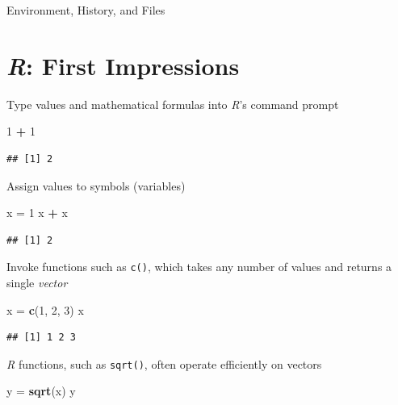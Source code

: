 \documentclass[]{article}
\newenvironment{Shaded}{\begin{snugshade}}{\end{snugshade}}
\newcommand{\KeywordTok}[1]{\textcolor[rgb]{0.13,0.29,0.53}{\textbf{#1}}}
\newcommand{\DecValTok}[1]{\textcolor[rgb]{0.00,0.00,0.81}{#1}}
\newcommand{\StringTok}[1]{\textcolor[rgb]{0.31,0.60,0.02}{#1}}
\newcommand{\OperatorTok}[1]{\textcolor[rgb]{0.81,0.36,0.00}{\textbf{#1}}}
\newcommand{\NormalTok}[1]{#1}
\theoremstyle{definition}
\theoremstyle{definition}
\theoremstyle{remark}
\begin{document}
Environment, History, and Files

\section{\texorpdfstring{\emph{R}: First
Impressions}{R: First Impressions}}\label{r-first-impressions}

Type values and mathematical formulas into \emph{R}'s command prompt

\begin{Shaded}
\begin{Highlighting}[]
\DecValTok{1} \OperatorTok{+}\StringTok{ }\DecValTok{1}
\end{Highlighting}
\end{Shaded}

\begin{verbatim}
## [1] 2
\end{verbatim}

Assign values to symbols (variables)

\begin{Shaded}
\begin{Highlighting}[]
\NormalTok{x =}\StringTok{ }\DecValTok{1}
\NormalTok{x }\OperatorTok{+}\StringTok{ }\NormalTok{x}
\end{Highlighting}
\end{Shaded}

\begin{verbatim}
## [1] 2
\end{verbatim}

Invoke functions such as \texttt{c()}, which takes any number of values
and returns a single \emph{vector}

\begin{Shaded}
\begin{Highlighting}[]
\NormalTok{x =}\StringTok{ }\KeywordTok{c}\NormalTok{(}\DecValTok{1}\NormalTok{, }\DecValTok{2}\NormalTok{, }\DecValTok{3}\NormalTok{)}
\NormalTok{x}
\end{Highlighting}
\end{Shaded}

\begin{verbatim}
## [1] 1 2 3
\end{verbatim}

\emph{R} functions, such as \texttt{sqrt()}, often operate efficiently
on vectors

\begin{Shaded}
\begin{Highlighting}[]
\NormalTok{y =}\StringTok{ }\KeywordTok{sqrt}\NormalTok{(x)}
\NormalTok{y}
\end{Highlighting}
\end{Shaded}
\end{document}

